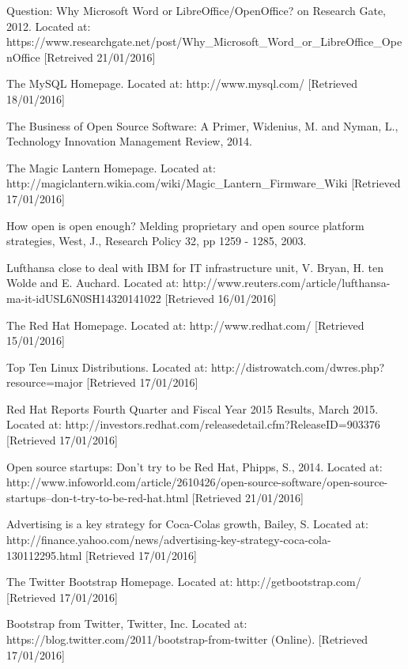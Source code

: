 \begin{thebibliography}{100}
 Question: Why Microsoft Word or LibreOffice/OpenOffice? on Research Gate,
2012.
Located at: https://www.researchgate.net/post/Why\_Microsoft\_Word\_or\_LibreOffice\_OpenOffice [Retreived 21/01/2016]

 The MySQL Homepage.
  Located at: http://www.mysql.com/ [Retrieved 18/01/2016]

 The Business of Open Source Software: A Primer,
    Widenius, M. and Nyman, L.,
    Technology Innovation Management Review,
    2014.

 The Magic Lantern Homepage.
  Located at: http://magiclantern.wikia.com/wiki/Magic\_Lantern\_Firmware\_Wiki [Retrieved 17/01/2016]

 How open is open enough? Melding proprietary and open source platform strategies,
  West, J.,
  Research Policy 32,
  pp 1259 - 1285,
  2003.

 Lufthansa close to deal with IBM for IT infrastructure unit,
  V. Bryan, H. ten Wolde and E. Auchard.
  Located at: http://www.reuters.com/article/lufthansa-ma-it-idUSL6N0SH14320141022 [Retrieved 16/01/2016]

 The Red Hat Homepage.
  Located at: http://www.redhat.com/ [Retrieved 15/01/2016]

 Top Ten Linux Distributions.
  Located at: http://distrowatch.com/dwres.php?resource=major [Retrieved 17/01/2016]

 Red Hat Reports Fourth Quarter and Fiscal Year 2015 Results,
  March 2015.
  Located at: http://investors.redhat.com/releasedetail.cfm?ReleaseID=903376 [Retrieved 17/01/2016]
  
Open source startups: Don't try to be Red Hat,
Phipps, S.,
2014.
Located at: http://www.infoworld.com/article/2610426/open-source-software/open-source-startups--don-t-try-to-be-red-hat.html [Retrieved 21/01/2016]

 Advertising is a key strategy for Coca-Colas growth,
  Bailey, S.
  Located at:  http://finance.yahoo.com/news/advertising-key-strategy-coca-cola-130112295.html [Retrieved 17/01/2016]

 The Twitter Bootstrap Homepage.
  Located at:  http://getbootstrap.com/ [Retrieved 17/01/2016]

 Bootstrap from Twitter, 
  Twitter, Inc.
  Located at: https://blog.twitter.com/2011/bootstrap-from-twitter (Online). [Retrieved 17/01/2016]


\end{thebibliography}
